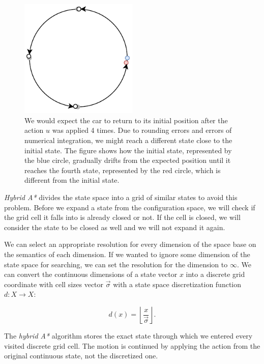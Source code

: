 \begin{figure}
	\centering
	\includegraphics[width=0.5\textwidth]{../img/non_discretized_astar_state_duplication}
	\caption{We would expect the car to return to its initial position after the action $u$ was applied 4 times. Due to rounding errors and errors of numerical integration, we might reach a different state close to the initial state. The figure shows how the initial state, represented by the blue circle, gradually drifts from the expected position until it reaches the fourth state, represented by the red circle, which is different from the initial state.}
	\label{fig:no_discretization_example}
\end{figure}

\textit{Hybrid A*} divides the state space into a grid of similar states to avoid this problem. Before we expand a state from the configuration space, we will check if the grid cell it falls into is already closed or not. If the cell is closed, we will consider the state to be closed as well and we will not expand it again.

We can select an appropriate resolution for every dimension of the space base on the semantics of each dimension. If we wanted to ignore some dimension of the state space for searching, we can set the resolution for the dimension to $\infty$. We can convert the continuous dimensions of a state vector $x$ into a discrete grid coordinate with cell sizes vector $\vec{\sigma}$ with a state space discretization function $d: X\rightarrow X$:

\[
d(x) = \left\lfloor \dfrac{x}{\vec{\sigma}} \right\rfloor.
\]

The \textit{hybrid A*} algorithm stores the exact state through which we entered every visited discrete grid cell. The motion is continued by applying the action from the original continuous state, not the discretized one.

